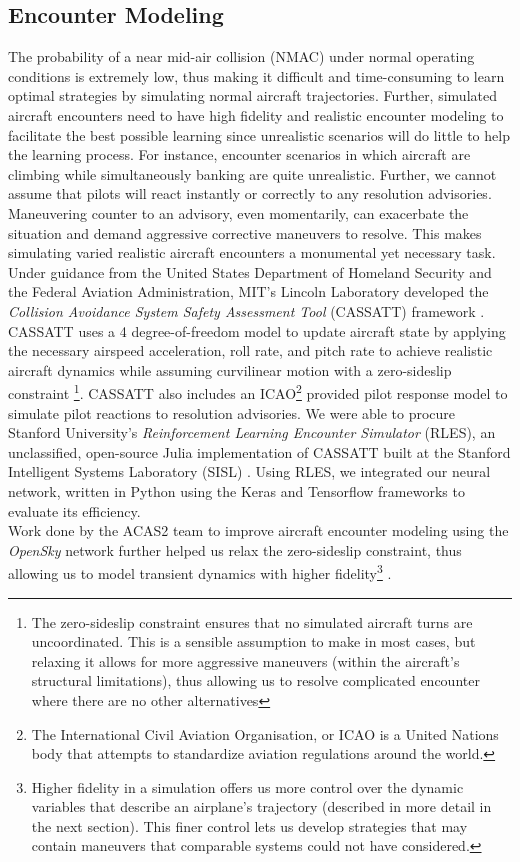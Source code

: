 \documentclass[journal, a4paper]{IEEEtran}
\begin{document}
   \subsection{Encounter Modeling}
   The probability of a near mid-air collision (NMAC) under normal operating conditions is extremely low, thus making it difficult and time-consuming to learn optimal strategies by simulating normal aircraft trajectories. Further, simulated aircraft encounters need to have high fidelity and realistic encounter modeling to facilitate the best possible learning since unrealistic scenarios will do little to help the learning process. For instance, encounter scenarios in which aircraft are climbing while simultaneously banking are quite unrealistic. Further, we cannot assume that pilots will react instantly or correctly to any resolution advisories. Maneuvering counter to an advisory, even momentarily, can exacerbate the situation and demand aggressive corrective maneuvers to resolve. This makes simulating varied realistic aircraft encounters a monumental yet necessary task. Under guidance from the United States Department of Homeland Security and the Federal Aviation Administration, MIT's Lincoln Laboratory developed the \textit{Collision Avoidance System Safety Assessment Tool} (CASSATT) framework \cite{cassattpap}. CASSATT uses a 4 degree-of-freedom model to update aircraft state by applying the necessary airspeed acceleration, roll rate, and pitch rate to achieve realistic aircraft dynamics while assuming curvilinear motion with a zero-sideslip constraint \footnote{The zero-sideslip constraint ensures that no simulated aircraft turns are uncoordinated. This is a sensible assumption to make in most cases, but relaxing it allows for more aggressive maneuvers (within the aircraft's structural limitations), thus allowing us to resolve complicated encounter where there are no other alternatives}. CASSATT also includes an ICAO\footnote{The International Civil Aviation Organisation, or ICAO is a United Nations body that attempts to standardize aviation regulations around the world.} provided pilot response model to simulate pilot reactions to resolution advisories. We were able to procure Stanford University's \textit{Reinforcement Learning Encounter Simulator} (RLES), an unclassified, open-source Julia implementation of CASSATT built at the Stanford Intelligent Systems Laboratory (SISL) \cite{sislrles}. Using RLES, we integrated our neural network, written in Python using the Keras and Tensorflow frameworks to evaluate its efficiency. 
\\Work done by the ACAS2 team to improve aircraft encounter modeling using the \textit{OpenSky} network further helped us relax the zero-sideslip constraint, thus allowing us to model transient dynamics with higher fidelity\footnote{Higher fidelity in a simulation offers us more control over the dynamic variables that describe an airplane's trajectory (described in more detail in the next section). This finer control lets us develop strategies that may contain maneuvers that comparable systems could not have considered.} \cite{tyronecite}.
\end{document}

